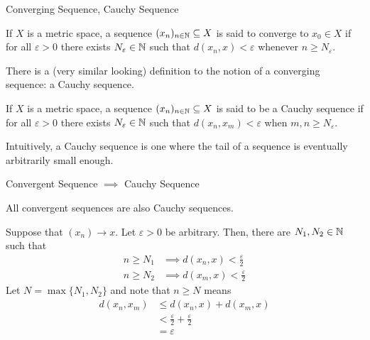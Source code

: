 \documentclass[10pt]{beamer}
\begin{document}
    \begin{frame}{Converging Sequence, Cauchy Sequence}
        \begin{definition}
            If $X$ is a metric space, a sequence $(x_n)_{n\in\mathbb{N}} \subseteq X$ is said to \alert{converge} to $x_0\in X$ if for all $\varepsilon > 0$ there exists $N_{\varepsilon} \in \mathbb{N}$ such that $d(x_n, x) < \varepsilon$ whenever $n\geq N_{\varepsilon}$. 
        \end{definition}

        There is a (very similar looking) definition to the notion of a converging sequence: a \alert{Cauchy sequence}. 
        \begin{definition}
            If $X$ is a metric space, a sequence $(x_n)_{n\in\mathbb{N}} \subseteq X$ is said to be a \alert{Cauchy sequence} if for all $\varepsilon > 0$ there exists $N_{\varepsilon} \in \mathbb{N}$ such that $d(x_n, x_m) < \varepsilon$ when $m, n \geq N_{\varepsilon}$. 
        \end{definition}
        Intuitively, a Cauchy sequence is one where the tail of a sequence is eventually arbitrarily small enough. 
    \end{frame}

    \begin{frame}{Convergent Sequence $\implies$ Cauchy Sequence}
        \begin{theorem}
            All convergent sequences are also Cauchy sequences.
        \end{theorem}
        \begin{myproof}
            Suppose that $(x_n)\to x$. Let $\varepsilon > 0$ be arbitrary. Then, there are $N_1, N_2\in\mathbb{N}$ such that 
            \begin{align*}
                n\geq N_1 &\implies d(x_n, x) < \frac{\varepsilon}{2} \\ 
                n\geq N_2 &\implies d(x_m, x) < \frac{\varepsilon}{2}
            \end{align*}
            Let $N = \max\{N_1, N_2\}$ and note that $n\geq N$ means 
            \begin{align*}
                d(x_n, x_m) &\leq d(x_n, x) + d(x_m, x) \\ 
                &< \frac{\varepsilon}{2} + \frac{\varepsilon}{2} \\ 
                &= \varepsilon
            \end{align*}
        \end{myproof}
    \end{frame}
\end{document}
